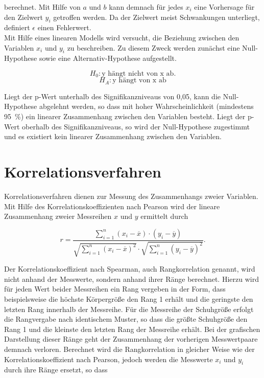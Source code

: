 berechnet. Mit Hilfe von $a$ und $b$ kann demnach für jedes $x_i$ eine Vorhersage für den Zielwert $y_i$ getroffen werden. Da der Zielwert meist Schwankungen unterliegt, definiert $\epsilon$ einen Fehlerwert. \parencite{frank_einfach_2006}\\

Mit Hilfe eines linearen Modells wird versucht, die Beziehung zwischen den Variablen $x_i$ und $y_i$ zu beschreiben. Zu diesem Zweck werden zunächst eine Null-Hypothese sowie eine Alternativ-Hypothese aufgestellt.

\begin{equation}
H_0: \text{y hängt nicht von x ab}. \nonumber
\end{equation}
\begin{equation}
H_A: \text{y hängt von x ab}
	\label{eq:null-hypo}
\end{equation}

Liegt der p-Wert unterhalb des Signifikanzniveaus von 0,05, kann die Null-Hypothese abgelehnt werden, so dass mit hoher Wahrscheinlichkeit (mindestens 95~\%) ein linearer Zusammenhang zwischen den Variablen besteht. Liegt der p-Wert oberhalb des Signifikanzniveaus, so wird der Null-Hypothese zugestimmt und es existiert kein linearer Zusammenhang zwischen den Variablen. \parencite{frank_einfach_2006}

\section{Korrelationsverfahren}

Korrelationsverfahren dienen zur Messung des Zusammenhangs zweier Variablen. Mit Hilfe des Korrelationskoeffizienten nach Pearson wird der lineare Zusammenhang zweier Messreihen $x$ und $y$ ermittelt durch

\begin{equation}
r =  \frac{\sum \limits_{i=1}^n (x_i-\overline{x}) \cdot (y_i-\overline{y})}{\sqrt{\sum \limits_{i=1}^n (x_i-\overline{x})^2} \cdot \sqrt{\sum \limits_{i=1}^n (y_i-\overline{y})^2}}.
	\label{eq:pearson}
\end{equation}

Der Korrelationskoeffizient nach Spearman, auch Rangkorrelation genannt, wird nicht anhand der Messwerte, sondern anhand ihrer Ränge berechnet. Hierzu wird für jeden Wert beider Messreihen ein Rang vergeben in der Form, dass beispielsweise die höchste Körpergröße den Rang 1 erhält und die geringste den letzten Rang innerhalb der Messreihe. Für die Messreihe der Schuhgröße erfolgt die Rangvergabe nach identischem Muster, so dass die größte Schuhgröße den Rang 1 und die kleinste den letzten Rang der Messreihe erhält. Bei der grafischen Darstellung dieser Ränge geht der Zusammenhang der vorherigen Messwertpaare demnach verloren. Berechnet wird die Rangkorrelation in gleicher Weise wie der Korrelationskoeffizient nach Pearson, jedoch werden die Messwerte $x_i$ und $y_i$ durch ihre Ränge ersetzt, so dass 

